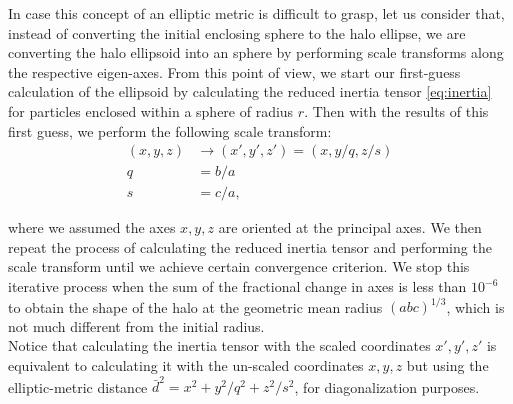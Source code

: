 In case this concept of an elliptic metric is difficult to grasp, let us consider that, instead of converting the initial enclosing sphere to the halo ellipse, we are converting the halo ellipsoid into an sphere by performing scale transforms along the respective eigen-axes. From this point of view, we start our first-guess calculation of the ellipsoid by calculating the reduced inertia tensor \eqref{eq:inertia} for particles enclosed within a sphere of radius $r$. Then with the results of this first guess, we perform the following scale transform:\\
  
\begin{align}
(x,y,z) &\rightarrow (x',y',z')=(x,y/q,z/s) \label{eq:scale}\\
q &=  b/a \nonumber \\
s &= c/a \nonumber ,
\end{align}

where we assumed the axes $x,y,z$ are oriented at the principal axes. We then repeat the process of calculating the reduced inertia tensor and performing the scale transform until we achieve certain convergence criterion. We stop this iterative process when the sum of the fractional change in axes is less than $10^{-6}$ to obtain the shape of the halo at the geometric mean radius $(abc)^{1/3}$, which is not much different from the initial radius.\\

Notice that calculating the inertia tensor with the scaled coordinates $x',y',z'$ is equivalent to calculating it with the un-scaled coordinates $x,y,z$ but using the elliptic-metric distance $\bar{d}^2 = x^2+y^2/q^2+z^2/s^2$, for diagonalization purposes.\\

